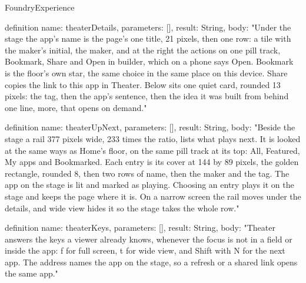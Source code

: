 \begin{lexlean}{FoundryExperience}
\begin{semanticmodule}
definition{
  name: theaterDetails,
  parameters: [],
  result: String,
  body: "Under the stage the app's name is the page's one title, 21 pixels, then one row: a tile with the maker's initial, the maker, and at the right the actions on one pill track, Bookmark, Share and Open in builder, which on a phone says Open. Bookmark is the floor's own star, the same choice in the same place on this device. Share copies the link to this app in Theater. Below sits one quiet card, rounded 13 pixels: the tag, then the app's sentence, then the idea it was built from behind one line, more, that opens on demand."
}

definition{
  name: theaterUpNext,
  parameters: [],
  result: String,
  body: "Beside the stage a rail 377 pixels wide, 233 times the ratio, lists what plays next. It is looked at the same ways as Home's floor, on the same pill track at its top: All, Featured, My apps and Bookmarked. Each entry is its cover at 144 by 89 pixels, the golden rectangle, rounded 8, then two rows of name, then the maker and the tag. The app on the stage is lit and marked as playing. Choosing an entry plays it on the stage and keeps the page where it is. On a narrow screen the rail moves under the details, and wide view hides it so the stage takes the whole row."
}

definition{
  name: theaterKeys,
  parameters: [],
  result: String,
  body: "Theater answers the keys a viewer already knows, whenever the focus is not in a field or inside the app: f for full screen, t for wide view, and Shift with N for the next app. The address names the app on the stage, so a refresh or a shared link opens the same app."
}
\end{semanticmodule}
\end{lexlean}
